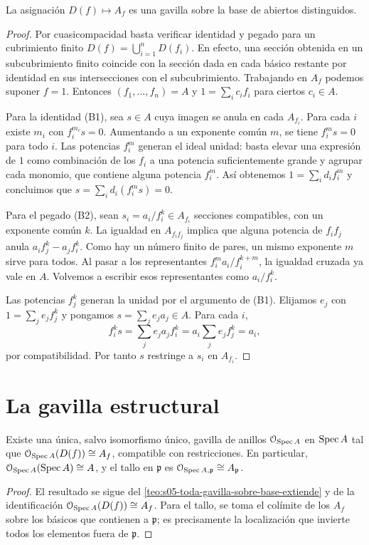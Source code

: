 \begin{teo}
\label{teo:s05-f-gavilla-sobre-base-d}
La asignación $D(f)\mapsto A_f$ es una gavilla sobre la base de abiertos distinguidos.
\end{teo}
\begin{proof}
Por cuasicompacidad basta verificar identidad y pegado para un cubrimiento finito $D(f)=\bigcup_{i=1}^nD(f_i)$. En efecto, una sección obtenida en un subcubrimiento finito coincide con la sección dada en cada básico restante por identidad en sus intersecciones con el subcubrimiento. Trabajando en $A_f$ podemos suponer $f=1$. Entonces $(f_1,\ldots,f_n)=A$ y $1=\sum_i c_if_i$ para ciertos $c_i\in A$.

Para la identidad (B1), sea $s\in A$ cuya imagen se anula en cada $A_{f_i}$. Para cada $i$ existe $m_i$ con $f_i^{m_i}s=0$. Aumentando a un exponente común $m$, se tiene $f_i^ms=0$ para todo $i$. Las potencias $f_i^m$ generan el ideal unidad: basta elevar una expresión de $1$ como combinación de los $f_i$ a una potencia suficientemente grande y agrupar cada monomio, que contiene alguna potencia $f_i^m$. Así obtenemos $1=\sum_i d_if_i^m$ y concluimos que $s=\sum_i d_i(f_i^ms)=0$.

Para el pegado (B2), sean $s_i=a_i/f_i^k\in A_{f_i}$ secciones compatibles, con un exponente común $k$. La igualdad en $A_{f_if_j}$ implica que alguna potencia de $f_if_j$ anula $a_if_j^k-a_jf_i^k$. Como hay un número finito de pares, un mismo exponente $m$ sirve para todos. Al pasar a los representantes $f_i^ma_i/f_i^{k+m}$, la igualdad cruzada ya vale en $A$. Volvemos a escribir esos representantes como $a_i/f_i^k$.

Las potencias $f_j^k$ generan la unidad por el argumento de (B1). Elijamos $e_j$ con $1=\sum_je_jf_j^k$ y pongamos $s=\sum_je_ja_j\in A$. Para cada $i$,
\[
f_i^ks=\sum_je_ja_jf_i^k
=a_i\sum_je_jf_j^k=a_i,
\]
por compatibilidad. Por tanto $s$ restringe a $s_i$ en $A_{f_i}$.
\end{proof}

\section{La gavilla estructural}

\begin{coro}
\label{coro:s05-gavilla-estructural}
Existe una única, salvo isomorfismo único, gavilla de anillos $\mathcal O_{\operatorname{Spec} A}$ en $\operatorname{Spec} A$ tal que $\mathcal O_{\operatorname{Spec} A}(D(f))\cong A_f$, compatible con restricciones. En particular, $\mathcal O_{\operatorname{Spec} A}(\operatorname{Spec} A)\cong A$, y el tallo en $\mathfrak p$ es $\mathcal O_{\operatorname{Spec} A,\mathfrak p}\cong A_{\mathfrak p}$.
\end{coro}
\begin{proof}
El resultado se sigue del \cref{teo:s05-toda-gavilla-sobre-base-extiende} y de la identificación $\mathcal O_{\operatorname{Spec} A}(D(f))\cong A_f$. Para el tallo, se toma el colímite de los $A_f$ sobre los básicos que contienen a $\mathfrak p$; es precisamente la localización que invierte todos los elementos fuera de $\mathfrak p$.
\end{proof}

